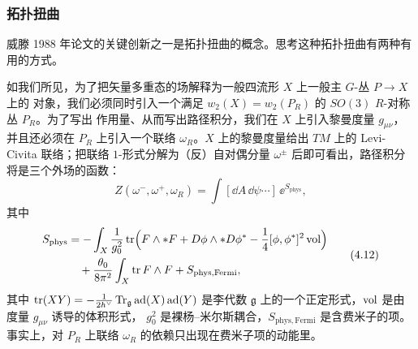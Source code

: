 

\subsubsection{拓扑扭曲}
\label{sec:4-2-2}

威滕 1988 年论文的关键创新之一是拓扑扭曲的概念。思考这种拓扑扭曲有两种有用的方式。

如我们所见，为了把矢量多重态的场解释为一般四流形 $X$ 上一般主 $G$-丛 $P\to X$ 上的
对象，我们必须同时引入一个满足 $w_2(X)=w_2(P_R)$ 的 $SO(3)$ $R$-对称丛 $P_R$。为了写出
作用量、从而写出路径积分，我们在 $X$ 上引入黎曼度量 $g_{\mu\nu}$，并且还必须在 $P_R$
上引入一个联络 $\omega_R$。$X$ 上的黎曼度量给出 $TM$ 上的 Levi-Civita 联络；把联络
$1$-形式分解为（反）自对偶分量 $\omega^{\pm}$ 后即可看出，路径积分将是三个外场的函数：
\begin{equation}
  Z(\omega^{-},\omega^{+},\omega_{R})=\int[\dd A\,\dd\psi\cdots]\,\ee^{S_{\mathrm{phys}}},
  \tag{4.11}
\end{equation}
其中
\begin{equation}
  \begin{aligned}
    S_{\mathrm{phys}}
    &=-\int_{X}\frac{1}{g_{0}^{2}}\operatorname{tr}\Bigl(
        F\wedge\ast F+D\phi\wedge\ast D\phi^{*}
        -\frac{1}{4}[\phi,\phi^{*}]^{2}\,\mathrm{vol}\Bigr)\\
    &\quad+\frac{\theta_{0}}{8\pi^{2}}\int_{X}\operatorname{tr} F\wedge F
      +S_{\mathrm{phys,Fermi}},
  \end{aligned}
  \tag{4.12}
\end{equation}
其中 $\operatorname{tr}(XY)=-\frac{1}{2h^{\vee}}\operatorname{Tr}_{\mathfrak{g}}\operatorname{ad}(X)\operatorname{ad}(Y)$ 是李代数
$\mathfrak{g}$ 上的一个正定形式，$\mathrm{vol}$ 是由度量 $g_{\mu\nu}$ 诱导的体积形式，
$g_{0}^{2}$ 是裸杨--米尔斯耦合，$S_{\mathrm{phys,Fermi}}$ 是含费米子的项。事实上，对
$P_{R}$ 上联络 $\omega_{R}$ 的依赖只出现在费米子项的动能里。

